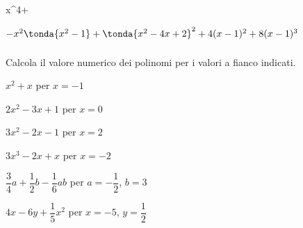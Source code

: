 \begin{esercizio}[*]
\begin{enumeratea}
x^{4}+\)
\item 
\(-x^{2}\tonda{x^{2}-1}+\tonda{x^{2}-4x+2}^{2}+4(x-1)^{2}+8(x-1)^{3}\)
\end{enumeratea}
\end{esercizio}

\subsubsection*{}

\begin{esercizio}
\label{ese:10.11}
Calcola il valore numerico dei polinomi per i valori a fianco indicati.

\begin{htmulticols}{2}
\begin{enumeratea}
\spazielenx
\item \(x^2+x\) \quad per \quad \(x=-1\)
\item \(2x^2-3x+1\) \quad per \quad \(x=0\)
\item \(3x^2-2x-1\) \quad per \quad \(x=2\)
\item \(3x^3-2x+x\) \quad per \quad \(x=-2\)
\item \(\dfrac{3}{4}a+\dfrac{1}{2}b-\dfrac{1}{6}ab\) \quad per \quad 
\(a=-\dfrac{1}{2}\), \hfill \(b=3\)
\item \(4x-6y+\dfrac{1}{5}x^2\) \quad per \quad \(x=-5\), 
\hfill \(y=\dfrac{1}{2}\)
\end{enumeratea}
\end{htmulticols}
\end{esercizio}

